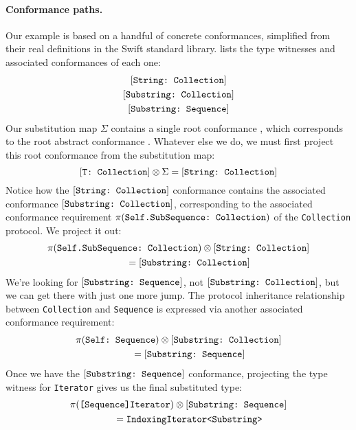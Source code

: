 \documentclass[../generics]{subfiles}
\begin{document}
\paragraph{Conformance paths.} Our example is based on a handful of concrete conformances, simplified from their real definitions in the Swift standard library.  lists the type witnesses and associated conformances of each one:
\begin{gather*}
\ConfReq{String}{Collection}\\
\ConfReq{Substring}{Collection}\\
\ConfReq{Substring}{Sequence}
\end{gather*}
Our substitution map $\Sigma$ contains a single root conformance , which corresponds to the root abstract conformance . Whatever else we do, we must first project this root conformance from the substitution map:
\[
[\texttt{T:~Collection}] \otimes \Sigma = [\texttt{String:~Collection}]
\]
Notice how the $[\texttt{String:~Collection}]$ conformance contains the associated conformance $[\texttt{Substring:~Collection}]$, corresponding to the associated conformance requirement $\pi(\texttt{Self.SubSequence:~Collection})$ of the \verb|Collection| protocol. We project it out:
\begin{gather*}
\pi(\texttt{Self.SubSequence:~Collection}) \otimes [\texttt{String:~Collection}]\\
\qquad {} = [\texttt{Substring:~Collection}]
\end{gather*}
We're looking for $[\texttt{Substring:~Sequence}]$, not $[\texttt{Substring:~Collection}]$, but we can get there with just one more jump. The protocol inheritance relationship between \texttt{Collection} and \texttt{Sequence} is expressed via another associated conformance requirement:
\begin{gather*}
\pi(\texttt{Self:~Sequence}) \otimes [\texttt{Substring:~Collection}]\\
\qquad {} = [\texttt{Substring:~Sequence}]
\end{gather*}
Once we have the $[\texttt{Substring:~Sequence}]$ conformance, projecting the type witness for \verb|Iterator| gives us the final substituted type:
\begin{gather*}
\pi(\texttt{[Sequence]Iterator})\otimes [\texttt{Substring:~Sequence}]\\
\qquad {} = \texttt{IndexingIterator<Substring>}
\end{gather*}
\end{document}

